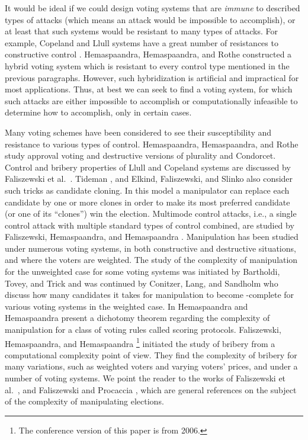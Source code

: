 It would be ideal if we could design voting systems that are \emph{immune} to described types of attacks (which means an attack would be impossible to accomplish), or at least that such systems would be resistant to many types of attacks.
For example, Copeland and Llull systems have a great number of resistances to constructive control \cite{faliszewski10}.
Hemaspaandra, Hemaspaandra, and Rothe \cite{hemaspaandra5} constructed a hybrid voting system which is resistant to every control type mentioned in the previous paragraphs.
However, such hybridization is artificial and impractical for most applications.
Thus, at best we can seek to find a voting system, for which such attacks are either impossible to accomplish or computationally infeasible to determine how to accomplish, only in certain cases.

Many voting schemes have been considered to see their susceptibility and resistance to various types of control.
Hemaspaandra, Hemaspaandra, and Rothe \cite{hemaspaandra} study approval voting and destructive versions of plurality and Condorcet.
Control and bribery properties of Llull and Copeland systems are discussed by Faliszewski et al.\ \cite{faliszewski10}.
Tideman \cite{tideman}, and Elkind, Faliszewski, and Slinko \cite{elkind} also consider such tricks as candidate cloning.
In this model a manipulator can replace each candidate by one or more clones in order to make its most preferred candidate (or one of its ``clones'') win the election.
Multimode control attacks, i.e., a single control attack with multiple standard types of control combined, are studied by Faliszewski, Hemaspaandra, and Hemaspaandra \cite{faliszewski3}.
Manipulation has been studied under numerous voting systems, in both constructive and destructive situations, and where the voters are weighted.
The study of the complexity of manipulation for the unweighted case for some voting systems was initiated by Bartholdi, Tovey, and Trick \cite{bartholdi3} and was continued by Conitzer, Lang, and Sandholm \cite{conitzer} who discuss how many candidates it takes for manipulation to become \NPclass-complete for various voting systems in the weighted case.
In \cite{hemaspaandra4} Hemaspaandra and Hemaspaandra present a dichotomy theorem regarding the complexity of manipulation for a class of voting rules called scoring protocols.
Fa\-li\-sze\-wski, Hemaspaandra, and Hemaspaandra \cite{faliszewski5}\footnote{The conference version of this paper is from 2006.} initiated the study of bri\-be\-ry from a computational complexity point of view.
They find the complexity of bribery for many variations, such as weighted voters and varying voters' prices, and under a number of voting systems.
We point the reader to the works of Faliszewski et al.\ \cite{faliszewski2}, and Faliszewski and Procaccia \cite{faliszewski8}, which are general references on the subject of the complexity of manipulating elections.

